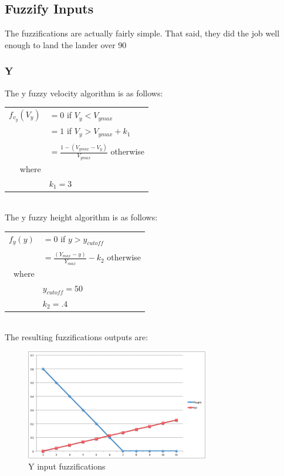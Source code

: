 \documentclass[12pt]{article}
\begin{document}
\subsection{Fuzzify Inputs}
The fuzzifications are actually fairly simple. That said, they did the job well enough to land the lander 
over 90%

\subsubsection{Y}
The y fuzzy velocity algorithm is as follows:

\begin{tabular}{r l}
	$f_{v_y}(V_y)$	&	$ = 0 $ if $ V_y < V_{y max} $ \\
				&	$ = 1 $ if  $ V_y > V_{y max} + k_1 $ \\
				& \\
 				&	$ = \frac{1 - (V_{y max} - V_y)}{V_{y max}} $ otherwise\\
	where		& \\
				& $k_1 = 3$
\end{tabular} \\

The y fuzzy height algorithm is as follows:

\begin{tabular}{r l}
	$f_{y}(y)$		&	$ = 0 $ if $ y > y_{cutoff} $ \\
				& \\
 				&	$ = \frac{(Y_{max} - y)}{Y_{max}} - k_2$ otherwise\\
	where		& \\
				& $y_{cutoff} = 50$ \\
				& $k_2 = .4$ \\
\end{tabular} \\

The resulting fuzzifications outputs are:

\begin{figure}[h!]
        \begin{center}
                \includegraphics[width=80mm]{report_images/yfuzzy.png}
                \caption{Y input fuzzifications}
                \label{yfuzzy}
        \end{center}
\end{figure}
\end{document}
